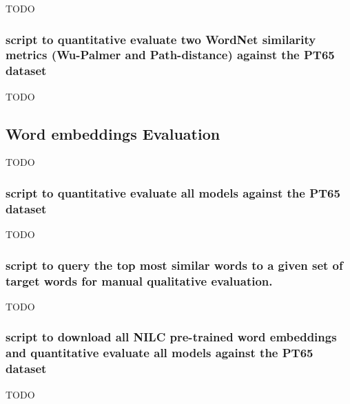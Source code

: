 TODO

\subsubsection{script to quantitative evaluate two WordNet similarity metrics (Wu-Palmer and Path-distance) against the PT65 dataset}

TODO

\subsection{Word embeddings Evaluation}

TODO

\subsubsection{script to quantitative evaluate all models against the PT65 dataset}

TODO

\subsubsection{script to query the top most similar words to a given set of target words for manual qualitative evaluation.}

TODO

\subsubsection{script to download all NILC pre-trained word embeddings and quantitative evaluate all models against the PT65 dataset}

TODO
